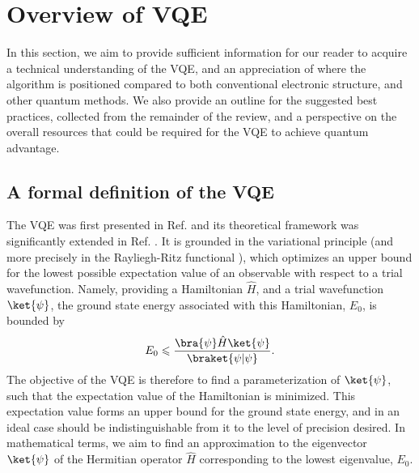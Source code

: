 
\section{Overview of VQE} \label{sec:overview}

In this section, we aim to provide sufficient information for our reader to acquire a technical understanding of the VQE, and an appreciation of where the algorithm is positioned compared to both conventional electronic structure, and other quantum methods. We also provide an outline for the suggested best practices, collected from the remainder of the review, and a perspective on the overall resources that could be required for the VQE to achieve quantum advantage.

\subsection{A formal definition of the VQE}

The VQE was first presented in Ref. \cite{Peruzzo2014} and its theoretical framework was significantly extended in Ref. \cite{mccleanTheoryVariationalHybrid2015}. It is grounded in the variational principle (and more precisely in the Rayliegh-Ritz functional \cite{Rayleigh1870, Ritz1908, Arfken1985}), which optimizes an upper bound for the lowest possible expectation value of an observable with respect to a trial wavefunction. Namely, providing a Hamiltonian $\hat{H}$, and a trial wavefunction $\ket{\psi}$, the ground state energy associated with this Hamiltonian, $E_0$, is bounded by
\begin{equation}
    E_0 \leqslant \frac{\bra{\psi}\hat{H}\ket{\psi}}{\braket{\psi | \psi}}. \label{eq:ritzfunc}
\end{equation}
The objective of the VQE is therefore to find a parameterization of $\ket{\psi}$, such that the expectation value of the Hamiltonian is minimized. This expectation value forms an upper bound for the ground state energy, and in an ideal case should be indistinguishable from it to the level of precision desired. In mathematical terms, we aim to find an approximation to the eigenvector $\ket{\psi}$ of the Hermitian operator $\hat{H}$ corresponding to the lowest eigenvalue, $E_0$.

